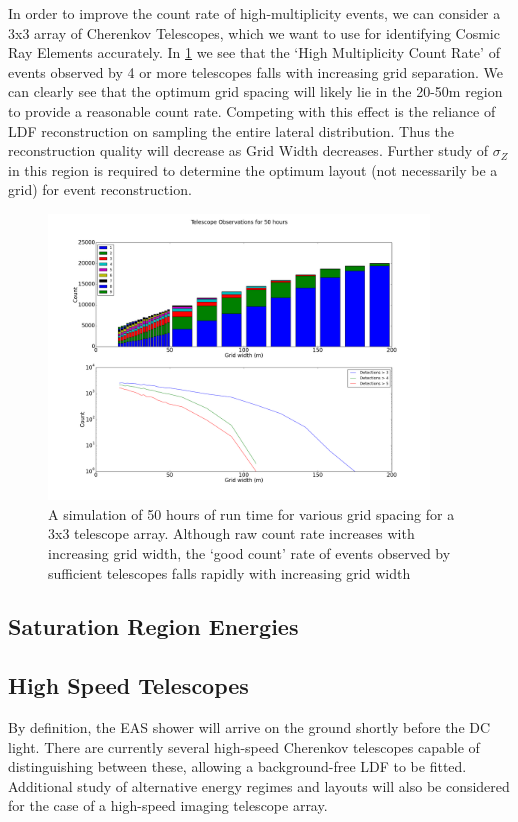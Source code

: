 \documentclass{article}
\begin{document}
In order to improve the count rate of high-multiplicity events, we can consider a 3x3 array of Cherenkov Telescopes, which we want to use for identifying Cosmic Ray Elements accurately. In \ref{fig:optmiselayout} we see that the \textquoteleft High Multiplicity Count Rate' of events observed by 4 or more telescopes falls with increasing grid separation. We can clearly see that the optimum grid spacing will likely lie in the 20-50m region to provide a reasonable count rate. Competing with this effect is the reliance of LDF reconstruction on sampling the entire lateral distribution. Thus the reconstruction quality will decrease as Grid Width decreases. Further study of $\sigma_{Z}$ in this region is required to determine the optimum layout (not necessarily be a grid) for event reconstruction. 

\begin{figure}
\begin{center}
\includegraphics[width=0.9\textwidth]{optimiselayout}
\caption{A simulation of 50 hours of run time for various grid spacing for a 3x3 telescope array. Although raw count rate increases with increasing grid width, the \textquoteleft good count' rate of events observed by sufficient telescopes falls rapidly with increasing grid width}
\label{fig:optmiselayout}
\end{center}
\end{figure}

\subsection{Saturation Region Energies}

\subsection{High Speed Telescopes}
By definition, the EAS shower will arrive on the ground shortly before the DC light. There are currently several high-speed Cherenkov telescopes capable of distinguishing between these, allowing a background-free LDF to be fitted. Additional study of alternative energy regimes and layouts will also be considered for the case of a high-speed imaging telescope array. 
\end{document}
